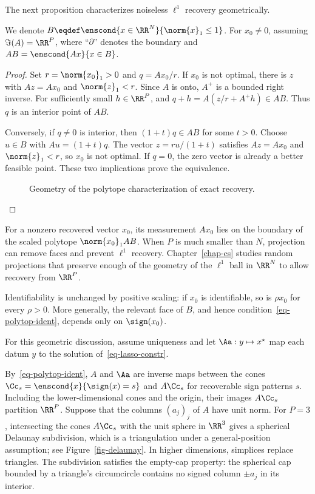 The next proposition characterizes noiseless $\ell^1$ recovery geometrically.

\begin{prop}\label{prop-polytope-proj}
	We denote $B \eqdef \enscond{x \in \RR^N}{\norm{x}_1 \leq 1}$. For $x_0\neq0$, assuming $\Im(A)=\RR^P$,
	where ``$\partial$'' denotes the boundary and $AB=\enscond{Ax}{x\in B}$.
\end{prop}

\begin{proof}
Set $r=\norm{x_0}_1>0$ and $q=Ax_0/r$. If $x_0$ is not optimal, there is $z$ with $Az=Ax_0$ and $\norm{z}_1<r$. Since $A$ is onto, $A^+$ is a bounded right inverse. For sufficiently small $h\in\RR^P$,
and $q+h=A(z/r+A^+h)\in AB$. Thus $q$ is an interior point of $AB$.

Conversely, if $q\neq0$ is interior, then $(1+t)q\in AB$ for some $t>0$. Choose $u\in B$ with $Au=(1+t)q$. The vector $z=ru/(1+t)$ satisfies $Az=Ax_0$ and $\norm{z}_1<r$, so $x_0$ is not optimal. If $q=0$, the zero vector is already a better feasible point. These two implications prove the equivalence.
\begin{figure}[tbp]
\centering
{}
\caption{Geometry of the polytope characterization of exact recovery.}
\label{fig-polytope-proof}
\end{figure}
\end{proof}

For a nonzero recovered vector $x_0$, its measurement $Ax_0$ lies on the boundary of the scaled polytope $\norm{x_0}_1 A B$. When $P$ is much smaller than $N$, projection can remove faces and prevent $\ell^1$ recovery. Chapter~\ref{chap-cs} studies random projections that preserve enough of the geometry of the $\ell^1$ ball in $\RR^N$ to allow recovery from $\RR^P$.

Identifiability is unchanged by positive scaling: if $x_0$ is identifiable, so is $\rho x_0$ for every $\rho>0$. More generally, the relevant face of $B$, and hence condition~\eqref{eq-polytop-ident}, depends only on $\sign(x_0)$.
 
For this geometric discussion, assume uniqueness and let $\Aa : y \mapsto x^\star$ map each datum $y$ to the solution of~\eqref{eq-lasso-constr}.
 
By~\eqref{eq-polytop-ident}, $A$ and $\Aa$ are inverse maps between the cones $\Cc_s = \enscond{x}{\sign(x)=s}$ and $A\Cc_s$ for recoverable sign patterns $s$. Including the lower-dimensional cones and the origin, their images $A\Cc_s$ partition $\RR^P$. Suppose that the columns $(a_j)_j$ of $A$ have unit norm. For $P=3$, intersecting the cones $A\Cc_s$ with the unit sphere in $\RR^3$ gives a spherical Delaunay subdivision, which is a triangulation under a general-position assumption; see Figure~\ref{fig-delaunay}. In higher dimensions, simplices replace triangles. The subdivision satisfies the empty-cap property: the spherical cap bounded by a triangle's circumcircle contains no signed column $\pm a_j$ in its interior.
 
